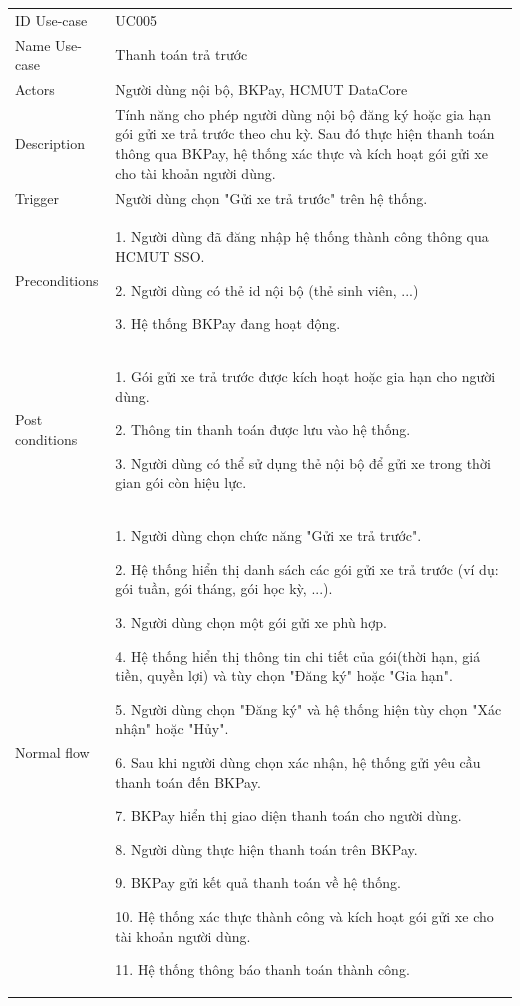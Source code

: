 \begin{center}
    \begin{tabular}{|m{2.5cm}|m{13cm}|}
    \hline
        ID Use-case  & UC005 \\ 
        Name Use-case & Thanh toán trả trước \\ 
    \hline
        Actors & Người dùng nội bộ, BKPay, HCMUT DataCore\\
    \hline
        Description & Tính năng cho phép người dùng nội bộ đăng ký hoặc gia hạn gói gửi xe trả trước theo chu kỳ. Sau đó thực hiện thanh toán thông qua BKPay, hệ thống xác thực và kích hoạt gói gửi xe cho tài khoản người dùng. \\
    \hline
        Trigger & Người dùng chọn "Gửi xe trả trước" trên hệ thống.\\
    \hline
        Preconditions & 
        1. Người dùng đã đăng nhập hệ thống thành công thông qua HCMUT SSO.

        2. Người dùng có thẻ id nội bộ (thẻ sinh viên, ...)
        
        3. Hệ thống BKPay đang hoạt động.
        \\
    \hline
        Post conditions & 
        1. Gói gửi xe trả trước được kích hoạt hoặc gia hạn cho người dùng.
        
        2. Thông tin thanh toán được lưu vào hệ thống.
        
        3. Người dùng có thể sử dụng thẻ nội bộ để gửi xe trong thời gian gói còn hiệu lực.\\
    \hline
        Normal flow & 
        1. Người dùng chọn chức năng "Gửi xe trả trước".
        
        2. Hệ thống hiển thị danh sách các gói gửi xe trả trước (ví dụ: gói tuần, gói tháng, gói học kỳ, ...).
        
        3. Người dùng chọn một gói gửi xe phù hợp.
        
        4. Hệ thống hiển thị thông tin chi tiết của gói(thời hạn, giá tiền, quyền lợi) và tùy chọn "Đăng ký" hoặc "Gia hạn".
        
        5. Người dùng chọn "Đăng ký" và hệ thống hiện tùy chọn "Xác nhận" hoặc "Hủy".
        
        6. Sau khi người dùng chọn xác nhận, hệ thống gửi yêu cầu thanh toán đến BKPay.
        
        7. BKPay hiển thị giao diện thanh toán cho người dùng.
        
        8. Người dùng thực hiện thanh toán trên BKPay.
        
        9. BKPay gửi kết quả thanh toán về hệ thống.
        
        10. Hệ thống xác thực thành công và kích hoạt gói gửi xe cho tài khoản người dùng.
        
        11. Hệ thống thông báo thanh toán thành công.\\
        \hline
    \end{tabular}
\end{center}

